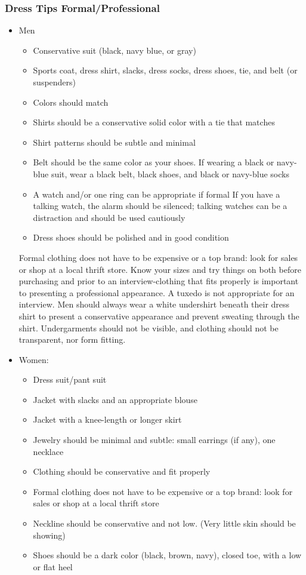 \subsubsection*{Dress Tips Formal/Professional }
\begin{itemize}[leftmargin=1.0cm]
	\item Men
	      \begin{itemize}
		      \item Conservative suit (black, navy blue, or gray)
		      \item Sports coat, dress shirt, slacks, dress socks, dress shoes, tie, and belt (or suspenders)
		      \item Colors should match
		      \item Shirts should be a conservative solid color with a tie that matches
		      \item Shirt patterns should be subtle and minimal
		      \item Belt should be the same color as your shoes. If wearing a black or navy-blue suit, wear a black belt, black shoes, and black or navy-blue socks
		      \item A watch and/or one ring can be appropriate if formal If you have a talking watch, the alarm should be silenced; talking watches can be a distraction and should be used cautiously
		      \item Dress shoes should be polished and in good condition
	      \end{itemize}
	      Formal clothing does not have to be expensive or a top brand: look for sales or shop at a local thrift store. Know your sizes and try things on both before purchasing and prior to an interview-clothing that fits properly is important to presenting a professional appearance. A tuxedo is not appropriate for an interview. Men should always wear a white undershirt beneath their dress shirt to present a conservative appearance and prevent sweating through the shirt. Undergarments should not be visible, and clothing should not be transparent, nor form fitting.
	\item Women:
	      \begin{itemize}
		      \item Dress suit/pant suit
		      \item Jacket with slacks and an appropriate blouse
		      \item Jacket with a knee-length or longer skirt
		      \item Jewelry should be minimal and subtle: small earrings (if any), one necklace
		      \item Clothing should be conservative and fit properly
		      \item Formal clothing does not have to be expensive or a top brand: look for sales or shop at a local thrift store
		      \item Neckline should be conservative and not low. (Very little skin should be showing)
		      \item Shoes should be a dark color (black, brown, navy), closed toe, with a low or flat heel


\end{itemize}
\end{itemize}
